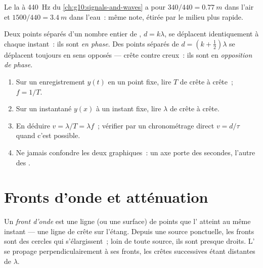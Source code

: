 \begin{example}\label{ex:g12:mechanical-waves:concertA}
Le la à \qty{440}{Hz} du \cref{ch:g10:signals-and-waves} a pour
 $340/440 = \qty{0.77}{m}$ dans l'air et
$1500/440 = \qty{3.4}{m}$ dans l'eau~: même note, étirée par le milieu
plus rapide.
\end{example}

\begin{definition}\label{def:g12:mechanical-waves:phase}
Deux points séparés d'un nombre entier de ,
$d = k\lambda$, se déplacent identiquement à chaque instant~: ils sont
\emph{en phase}. Des points séparés de
$d = (k + \tfrac12)\lambda$ se déplacent toujours en sens opposés ---
crête contre creux~: ils sont en \emph{opposition de phase}.
\end{definition}

\begin{method}\label{met:g12:mechanical-waves:reading}
\begin{enumerate}
  \item Sur un enregistrement $y(t)$ en un point fixe, lire $T$ de crête
        à crête~; $f = 1/T$.
  \item Sur un instantané $y(x)$ à un instant fixe, lire $\lambda$ de
        crête à crête.
  \item En déduire $v = \lambda/T = \lambda f$~; vérifier par un
        chronométrage direct $v = d/\tau$ quand c'est possible.
  \item Ne jamais confondre les deux graphiques~: un axe porte des
        secondes, l'autre des .
\end{enumerate}
\end{method}

\section{Fronts d'onde et atténuation}

\begin{definition}\label{def:g12:mechanical-waves:wavefront}
Un \emph{front d'onde} est une ligne (ou une
surface) de points que l' atteint au même instant --- une
ligne de crête sur l'étang. Depuis une source ponctuelle, les fronts
sont des cercles qui s'élargissent~; loin de toute source, ils sont
presque droits. L' se propage perpendiculairement à ses
fronts, les crêtes successives étant distantes de $\lambda$.
\end{definition}

